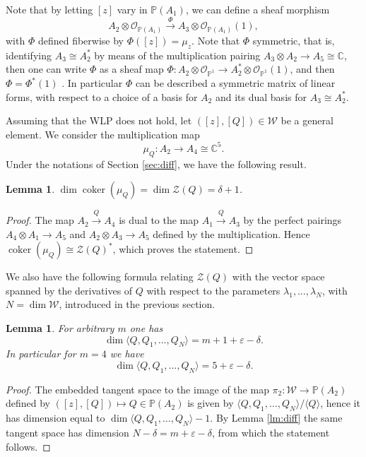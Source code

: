 \documentclass[10pt, a4paper]{amsart}
\theoremstyle{plain}
\newtheorem{lm}[prop]{Lemma}
\theoremstyle{definition}
\theoremstyle{remark}
\def\OO{\mathcal{O}}
\def\C{\mathbb{C}}
\def\PP{\mathbb{P}}
\begin{document}
 Note that by letting $[z]$ vary in $\PP(A_1)$, we can define a sheaf morphism
 \begin{equation}\label{eq:Kbundle} A_2\otimes\OO_{\PP(A_1)}\stackrel{\Phi}\longrightarrow A_3\otimes \OO_{\PP(A_1)}(1),
 \end{equation}
 with $\Phi$ defined fiberwise by $\Phi([z])=\mu_z$.
 Note that $\Phi$ symmetric, that is, identifying $A_3\cong A_2^\ast$ by means of the multiplication pairing $A_3\otimes A_2\to A_5\cong\C$, then one can write $\Phi$ as a sheaf map $\Phi\colon A_2\otimes\OO_{\PP^1}\to A_2^\ast\otimes\OO_{\PP^1}(1)$, and then $\Phi=\Phi^\ast(1)$ .  In particular $\Phi$ can be described a symmetric matrix of linear forms, with respect to a choice of a basis for $A_2$ and its dual basis for $A_3\cong A_2^\ast$.
 
Assuming that the WLP does not hold, let $([z],[Q])\in\mathcal{W}$ be a general element. We consider the multiplication map
 $$\mu_Q:A_2\longrightarrow A_4\cong \C^5.$$
 Under the notations of Section \ref{sec:diff}, we have the following result.
 \begin{lm}\label{lm:cokermuQ} $\dim\operatorname{coker}(\mu_Q)=\dim \mathcal{Z}(Q)=\delta+1$.
 \end{lm}
 \begin{proof} The map $A_2\stackrel{Q}\longrightarrow A_4$ is dual to the map $A_1\stackrel{Q}\longrightarrow A_3$ by the perfect pairings $A_4\otimes A_1\to A_5$ and $A_2\otimes A_3\to A_5$ defined by the multiplication. Hence $\operatorname{coker}(\mu_Q)\cong \mathcal{Z}(Q)^\ast$, which proves the statement.
 \end{proof}

 We also have the following formula relating $\mathcal{Z}(Q)$ with the vector space spanned by the derivatives of $Q$ with respect to the parameters $\lambda_1,\ldots,\lambda_N$, with $N=\dim\mathcal{W}$, introduced in the previous section.

 \begin{lm}\label{lm:spanQi}  For arbitrary $m$ one has $$\dim \langle Q,Q_1,\ldots,Q_N\rangle= m+1+\varepsilon-\delta.$$ In particular for $m=4$ we have $$\dim\langle Q,Q_1,\ldots,Q_N\rangle = 5+\varepsilon-\delta.$$
 \end{lm}
 \begin{proof}
 The embedded tangent space to the image of the map $\pi_2:\mathcal{W}\longrightarrow \PP(A_2)$ defined by $([z],[Q])\mapsto Q\in \PP(A_2)$ is given by $\langle Q, Q_1,\ldots,Q_N\rangle/\langle Q\rangle$, hence it has dimension equal to $\dim\langle Q,Q_1,\ldots,Q_N\rangle-1$.  By Lemma \ref{lm:diff} the same tangent space has dimension $N-\delta=m+\varepsilon-\delta$, from which the statement follows.\end{proof}
\end{document}
